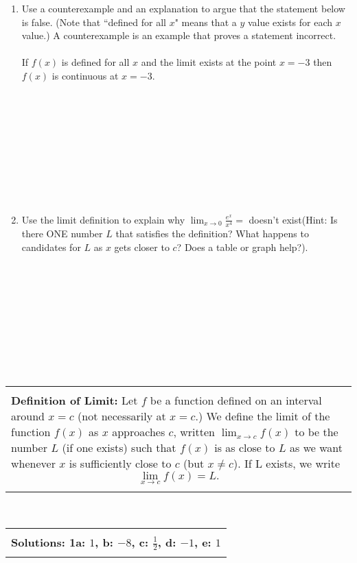\documentclass[12pt]{report}
\newenvironment{boxe}
    {\begin{center}
    \begin{tabular}{|p{0.9\textwidth}|}
    \hline\\
    }
    { 
    \\\\\hline
    \end{tabular} 
    \end{center}
    }
\begin{document}
\begin{enumerate}
\begin{enumerate}[label=\alph*.]
\end{enumerate}
\newpage
\item Use a counterexample and an explanation to argue that the statement below is false. (Note that ``defined for all $x$" means that a $y$ value exists for each $x$ value.) A counterexample is an example that proves a statement incorrect. \\\\
If $f(x)$ is defined for all $x$ and the limit exists at the point $x=-3$ then $f(x)$ is continuous at $x=-3$.\\\\\\\\\\\\\\\\\\\\

\item Use the limit definition to explain why $\displaystyle{\lim_{x\to 0} \frac{e^x}{x^4}} =$ doesn't exist(Hint: Is there ONE number $L$ that satisfies the definition? What happens to candidates for $L$ as $x$ gets closer to $c$? Does a table or graph help?).\\\\\\\\\\\\\\\\\\\\

\end{enumerate} 



\begin{boxe}  \textbf{Definition of Limit:} Let $f$ be a function defined on an interval around $x=c$ (not necessarily at $x = c.$) We define the limit of the function $f(x)$ as $x$ approaches $c$, written $\displaystyle\lim_{x\to c} f(x)$ to be the number $L$ (if one exists) such that $f(x)$ is as close to $L$ as we want whenever $x$ is sufficiently close to $c$ (but $x \neq c$). If L exists, we write
\[ \lim_{x\to c} f(x) = L. \]
\end{boxe}
\;\\


\begin{boxe}  \textbf{Solutions: 1a: $1$, b: $-8$, c: $\frac{1}{2}$, d: $-1$, e: $1$ } 
\end{boxe}
\end{document}

